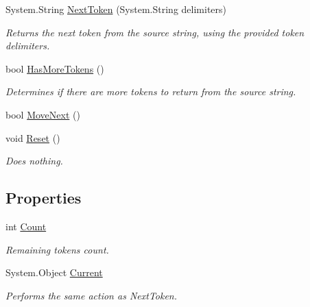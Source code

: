 \begin{DoxyCompactItemize}
System.String \hyperlink{class_support_class_1_1_tokenizer_a970155cb6e044edd0d0030af7aeb7965}{NextToken} (System.String delimiters)
\begin{DoxyCompactList}\small\item\em Returns the next token from the source string, using the provided token delimiters. \item\end{DoxyCompactList}\item 
bool \hyperlink{class_support_class_1_1_tokenizer_ae24726506d60ff6471493f1bf1188303}{HasMoreTokens} ()
\begin{DoxyCompactList}\small\item\em Determines if there are more tokens to return from the source string. \item\end{DoxyCompactList}\item 
bool \hyperlink{class_support_class_1_1_tokenizer_ae6041388e31dd6cac93061484fd6f5cb}{MoveNext} ()
\item 
void \hyperlink{class_support_class_1_1_tokenizer_aa47d0eb3332441841949258b4d568666}{Reset} ()
\begin{DoxyCompactList}\small\item\em Does nothing. \item\end{DoxyCompactList}\end{DoxyCompactItemize}
\subsection*{Properties}
\begin{DoxyCompactItemize}
\item 
int \hyperlink{class_support_class_1_1_tokenizer_aaafadcabbcd13d8ceae85eb615f756bd}{Count}
\begin{DoxyCompactList}\small\item\em Remaining tokens count. \item\end{DoxyCompactList}\item 
System.Object \hyperlink{class_support_class_1_1_tokenizer_a7e53bf2574e24fcc0fb2dedb98ea2e86}{Current}
\begin{DoxyCompactList}\small\item\em Performs the same action as NextToken. \item\end{DoxyCompactList}\end{DoxyCompactItemize}


